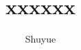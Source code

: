 \documentclass{article}
\begin{document}
\title{xxxxxx}
\author{Shuyue}
\date{} %
\maketitle%


\section*{}%
\end{document}
